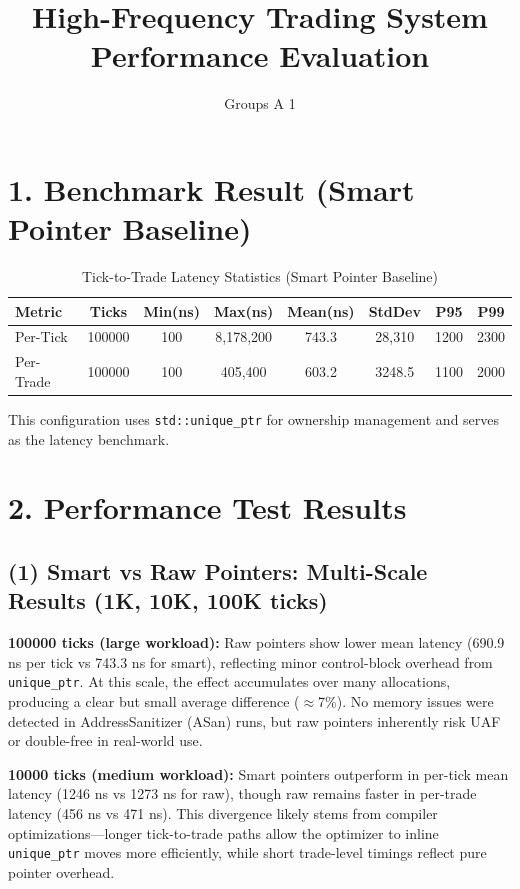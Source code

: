 \documentclass[a4paper,12pt]{article}
\title{High-Frequency Trading System Performance Evaluation}
\author{Groups A 1}
\date{}
\begin{document}
\maketitle

\section*{1. Benchmark Result (Smart Pointer Baseline)}
\begin{table}[h!]
\centering
\caption{Tick-to-Trade Latency Statistics (Smart Pointer Baseline)}
\begin{tabular}{lccccccc}
\toprule
Metric & Ticks & Min(ns) & Max(ns) & Mean(ns) & StdDev & P95 & P99 \\
\midrule
Per-Tick & 100000 & 100 & 8{,}178{,}200 & 743.3 & 28{,}310 & 1200 & 2300 \\
Per-Trade & 100000 & 100 & 405{,}400 & 603.2 & 3248.5 & 1100 & 2000 \\
\bottomrule
\end{tabular}
\end{table}

This configuration uses \texttt{std::unique\_ptr} for ownership management and serves as the latency benchmark.

\section*{2. Performance Test Results}

\subsection*{(1) Smart vs Raw Pointers: Multi-Scale Results (1K, 10K, 100K ticks)}

\textbf{100000 ticks (large workload):}
Raw pointers show lower mean latency (690.9 ns per tick vs 743.3 ns for smart), reflecting minor control-block overhead from \texttt{unique\_ptr}. 
At this scale, the effect accumulates over many allocations, producing a clear but small average difference ($\approx$7\%). 
No memory issues were detected in AddressSanitizer (ASan) runs, but raw pointers inherently risk UAF or double-free in real-world use.

\textbf{10000 ticks (medium workload):}
Smart pointers outperform in per-tick mean latency (1246 ns vs 1273 ns for raw), though raw remains faster in per-trade latency (456 ns vs 471 ns). 
This divergence likely stems from compiler optimizations—longer tick-to-trade paths allow the optimizer to inline \texttt{unique\_ptr} moves more efficiently, while short trade-level timings reflect pure pointer overhead.
\end{document}
